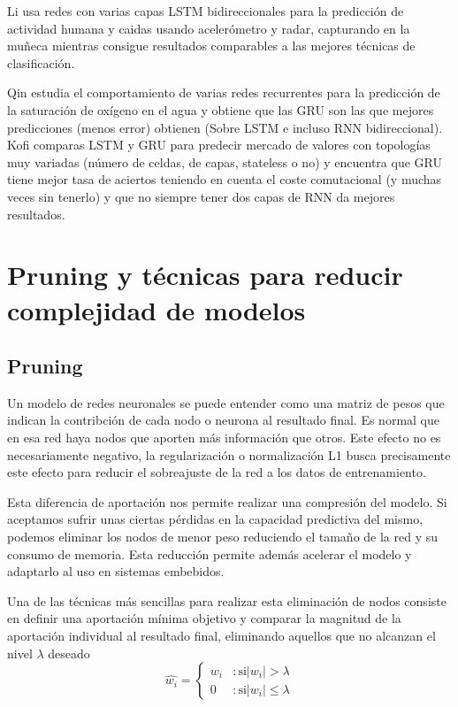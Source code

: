 \documentclass[../tfm.tex]{subfiles}
\begin{document}
Li\cite{Li2019} usa redes con varias capas LSTM bidireccionales para la predicción de actividad humana y caidas usando acelerómetro y radar, capturando en la muñeca mientras consigue resultados comparables a las mejores técnicas de clasificación.

Qin\cite{Qin2019} estudia el comportamiento de varias redes recurrentes para la predicción de la saturación de oxígeno en el agua y obtiene que las GRU son las que mejores predicciones (menos error) obtienen (Sobre LSTM e incluso RNN bidireccional). Kofi \cite{Koffi2020} comparas LSTM y GRU para predecir mercado de valores con topologías muy variadas (número de celdas, de capas, stateless o no) y encuentra que GRU tiene mejor tasa de aciertos teniendo en cuenta el coste comutacional (y muchas veces sin tenerlo) y que no siempre tener dos capas de RNN da mejores resultados.


\section{Pruning y técnicas para reducir complejidad de modelos}

\subsection{Pruning}
Un modelo de redes neuronales se puede entender como una matriz de pesos que indican la contribción de cada nodo o neurona al resultado final. Es normal que en esa red haya nodos que aporten más información que otros. Este efecto no es necesariamente negativo, la regularización o normalización L1 busca precisamente este efecto para reducir el sobreajuste de la red a los datos de entrenamiento.

Esta diferencia de aportación nos permite realizar una compresión del modelo. Si aceptamos sufrir unas ciertas pérdidas en la capacidad predictiva del mismo, podemos eliminar los nodos de menor peso reduciendo el tamaño de la red y su consumo de memoria. Esta reducción permite además acelerar el modelo y adaptarlo al uso en sistemas embebidos.


Una de las técnicas más sencillas para realizar esta eliminación de nodos consiste en definir una aportación mínima objetivo y comparar la magnitud de la aportación individual al resultado final, eliminando aquellos que no alcanzan el nivel $\lambda$ deseado
\[
\hat{w_i} = \left\{ \begin{matrix} w_i & :\mbox{si} |w_i|>\lambda\\
  0 & :\mbox{si} |w_i|\leq\lambda\end{matrix} \right.
\]
\end{document}
